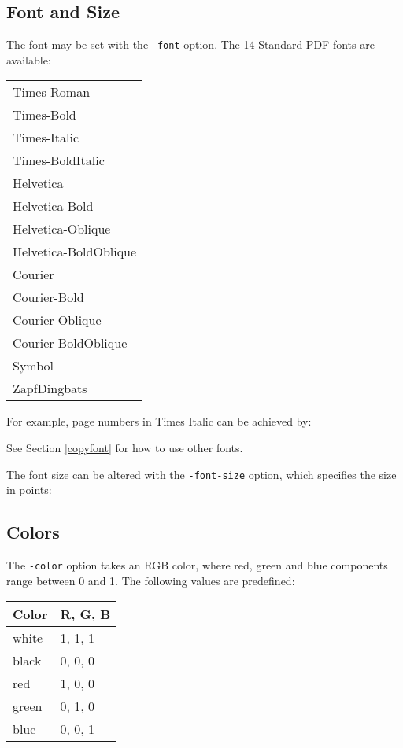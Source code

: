 \documentclass{book}
\begin{document}
  \subsection{Font and Size}
  The font may be set with the \texttt{-font} option. The 14 Standard PDF fonts are available:

  \vspace{2mm}
  \begin{tabular}{l}
  Times-Roman\\
  Times-Bold\\
  Times-Italic\\
  Times-BoldItalic\\
  Helvetica\\
  Helvetica-Bold\\
  Helvetica-Oblique\\
  Helvetica-BoldOblique\\
  Courier\\
  Courier-Bold\\
  Courier-Oblique\\
  Courier-BoldOblique\\
  Symbol\\
  ZapfDingbats
  \end{tabular}



  \noindent For example, page numbers in Times Italic can be achieved by:

\noindent{}

  \noindent See Section \ref{copyfont} for how to use other fonts.

  The font size can be altered with the \texttt{-font-size} option, which
specifies the size in points:

\noindent{}

  \subsection{Colors}
  The \texttt{-color} option takes an RGB color, where red, green and blue
components range between 0 and 1. The following values are predefined:

  \vspace{2mm}
  \begin{tabular}{ll}
    \textbf{Color} & \textbf{R, G, B} \\ \hline
     white & 1, 1, 1\\
     black & 0, 0, 0\\
     red & 1, 0, 0\\
     green & 0, 1, 0\\
     blue & 0, 0, 1\\
  \end{tabular}
\end{document}
